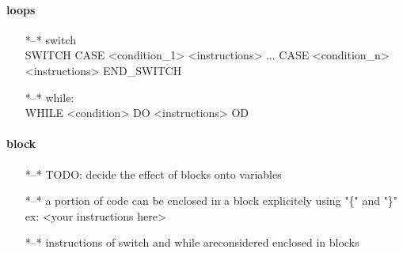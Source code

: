 \documentclass[10pt,a4paper,final]{report}
\begin{document}
\paragraph{loops}
\begin{itemize}
\item[*--*]switch\:
	\\SWITCH
	CASE <condition\_1>
		<instructions>
	...
	CASE <condition\_n>
		<instructions>
	END\_SWITCH
\item[*--*]while:
	\\WHILE <condition> DO
		<instructions>
	OD

\end{itemize}

\paragraph{block}
\begin{itemize}
\item[*--*]TODO: decide the effect of blocks onto variables
\item[*--*]a portion of code can be enclosed in a block explicitely using "\{" and "\}"
	ex: { <your instructions here> }
\item[*--*]instructions of switch and while areconsidered enclosed in blocks
\end{itemize}
\end{document}

